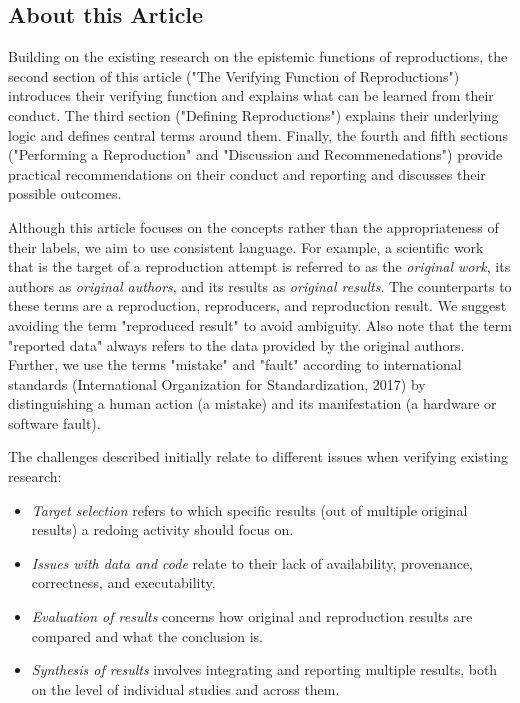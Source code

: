 \documentclass[authordate, meta]{jote-new-article}
\begin{document}
	\subsection{About this Article}



	Building on the existing research on the epistemic functions of reproductions, the second section of this article ("The Verifying Function of Reproductions") introduces their verifying function and explains what can be learned from their conduct. The third section ("Defining Reproductions") explains their underlying logic and defines central terms around them. Finally, the fourth and fifth sections ("Performing a Reproduction" and "Discussion and Recommenedations") provide practical recommendations on their conduct and reporting and discusses their possible outcomes.



	Although this article focuses on the concepts rather than the appropriateness of their labels, we aim to use consistent language. For example, a scientific work that is the target of a reproduction attempt is referred to as the \emph{original work}, its authors as \emph{original authors}, and its results as \emph{original results}. The counterparts to these terms are a reproduction, reproducers, and reproduction result. We suggest avoiding the term "reproduced result" to avoid ambiguity. Also note that the term "reported data" always refers to the data provided by the original authors. Further, we use the terms "mistake" and "fault" according to international standards (International Organization for Standardization, 2017) by distinguishing a human action (a mistake) and its manifestation (a hardware or software fault).



	The challenges described initially relate to different issues when verifying existing research:

	\begin{itemize}


		\item \emph{Target selection} refers to which specific results (out of multiple original results) a redoing activity should focus on.



		\item \emph{Issues with data and code} relate to their lack of availability, provenance, correctness, and executability.



		\item \emph{Evaluation of results} concerns how original and reproduction results are compared and what the conclusion is.



		\item \emph{Synthesis of results} involves integrating and reporting multiple results, both on the level of individual studies and across them.


	\end{itemize}
\end{document}
